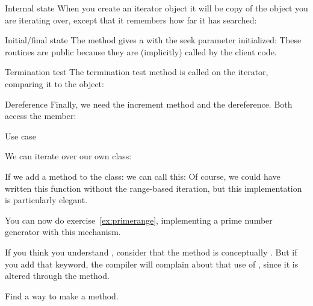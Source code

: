 \begin{block}{Internal state}
  \label{sl:bagseek}
  When you create an iterator object it will be copy of the object you
  are iterating over, except that it remembers how far it has
  searched:
\end{block}

\begin{block}{Initial/final state}
  \label{sl:bagbeginend}
  The  method gives a  with the seek parameter
  initialized:
  These routines are public because they are (implicitly) called by the
  client code.
\end{block}

\begin{block}{Termination test}
  \label{sl:bagtest}
  The termination test method is called on the iterator, comparing it to
  the  object:
\end{block}

\begin{block}{Dereference}
  \label{sl:bagderef}
  Finally, we need the increment method and the dereference. Both access
  the  member:
\end{block}

\begin{block}{Use case}
  \label{sl:bagfind}

  We can iterate over our own class:
\end{block}

If we add a method  to the class:
%
%
we can call this:
%
%
Of course, we could have written this function
without the range-based iteration, but this implementation is
particularly elegant.

\begin{exercise}
  You can now do exercise~\ref{ex:primerange}, implementing a prime
  number generator with this mechanism.
\end{exercise}

If you think you understand , consider that the 
method is conceptually . But if you add that keyword, the
compiler will complain about that use of , since it is
altered through the  method.

\begin{exercise}
  \label{ex:rangeconstiter}
  Find a way to make  a  method.
\end{exercise}

